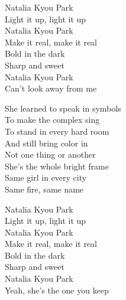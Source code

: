 \begin{lyrics}
Natalia Kyou Park\\
Light it up, light it up\\
Natalia Kyou Park\\
Make it real, make it real\\
Bold in the dark\\
Sharp and sweet\\
Natalia Kyou Park\\
Can’t look away from me

She learned to speak in symbols\\
To make the complex sing\\
To stand in every hard room\\
And still bring color in\\
Not one thing or another\\
She’s the whole bright frame\\
Same girl in every city\\
Same fire, same name

Natalia Kyou Park\\
Light it up, light it up\\
Natalia Kyou Park\\
Make it real, make it real\\
Bold in the dark\\
Sharp and sweet\\
Natalia Kyou Park\\
Yeah, she’s the one you keep
\end{lyrics}

